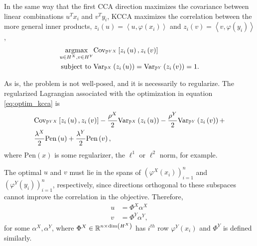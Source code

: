 \documentclass{article}
\begin{document}
In the same way that the first CCA direction maximizes the covariance between
linear combinations $u^{T}x_{i}$ and $v^{T}y_{i}$, KCCA maximizes the
correlation between the more general inner products, $z_{i}\left(u\right) =
\left<u, \varphi\left(x_{i}\right)\right>$ and $z_{i}\left(v\right) = \left<v,
\varphi\left(y_{i}\right)\right>$,
\begin{align}
  \mathop\mathrm{arg max}_{u \in H^{X}, v \in H^{Y}}
  &\mathrm{Cov}_{\mathbb{P}^{YX}}\left[{z_{i}\left(u\right), z_{i}\left(v\right)}\right] \label{eq:optim_kcca}\\
\text{subject to } &\mathrm{Var}_{\mathbb{P}^{X}}\left(z_{i}\left(u\right)\right) = \mathrm{Var}_{\mathbb{P}^{Y}}\left(z_{i}\left(v\right)\right) = 1. \nonumber
\end{align}

As is, the problem is not well-posed, and it is necessarily to regularize. The
regularized Lagrangian associated with the optimization in equation
\ref{eq:optim_kcca} is
\begin{align}
  &\mathrm{Cov}_{\mathbb{P}^{YX}}\left[{z_{i}\left(u\right), z_{i}\left(v\right)}\right] -
  \frac{\rho^{X}}{2}\mathrm{Var}_{\mathbb{P}^{X}}\left(z_{i}\left(u\right)\right) -
  \frac{\rho^{Y}}{2}\mathrm{Var}_{\mathbb{P}^{Y}}\left(z_{i}\left(v\right)\right) + \label{eq:lagrangian_kcca}\\
  &\frac{\lambda^{X}}{2}\text{Pen}\left(u\right) + \frac{\lambda^{Y}}{2}\text{Pen}\left(v\right), \nonumber
\end{align}
where $\text{Pen}\left(x\right)$ is some regularizer, the $\ell^{1}$ or
$\ell^{2}$ norm, for example.

The optimal $u$ and $v$ must lie in the spans of
$\left(\varphi^{X}\left(x_{i}\right)\right)_{i =1 }^{n}$ and
$\left(\varphi^{Y}\left(y_{i}\right)\right)_{i =1 }^{n}$, respectively, since
directions orthogonal to these subspaces cannot improve the correlation in the
objective. Therefore,
\begin{align*}
u &= \Phi^{X} \alpha^{X} \\
v &= \Phi^{Y} \alpha^{Y},
\end{align*}
for some $\alpha^{X}, \alpha^{Y}$, where $\Phi^{X} \in \mathbb{R}^{n \times
  \text{dim}\left(H^{X}\right)}$ has $i^{th}$ row
$\varphi^{Y}\left(x_{i}\right)$ and $\Phi^{Y}$ is defined similarly.
\end{document}
